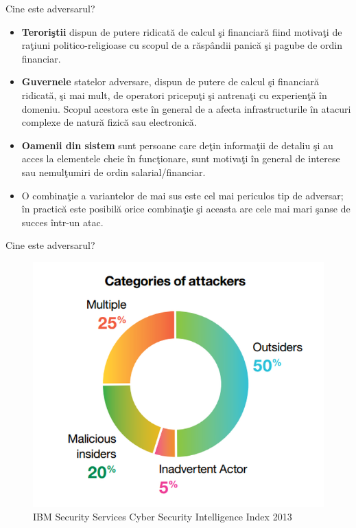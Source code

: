 \documentclass[pdf]{beamer}
\begin{document}
\begin{frame}{Cine este adversarul?}
\begin{itemize}
\item
\textbf{Teroriştii} dispun de putere ridicată de calcul şi financiară fiind motivaţi de raţiuni politico-religioase cu scopul de a răspândii panică şi pagube de ordin financiar.

\item
\textbf{Guvernele} statelor adversare, dispun de putere de calcul şi financiară ridicată, şi mai mult, de operatori pricepuţi şi antrenaţi cu experienţă în domeniu. Scopul acestora este în general de a afecta infrastructurile în atacuri complexe de natură fizică sau electronică.

\item
\textbf{Oamenii din sistem} sunt persoane care deţin informaţii de detaliu şi au acces la elementele cheie în funcţionare, sunt motivaţi în general de interese sau nemulţumiri de ordin salarial/financiar.

\item
O combinaţie a variantelor de mai sus este cel mai periculos tip de adversar; în practică este posibilă orice combinaţie şi aceasta are cele mai mari şanse de succes într-un atac.

\end{itemize}
\end{frame}



\begin{frame}{Cine este adversarul?}
\begin{figure}[t]
\centering
\includegraphics[scale=0.5]{Images/categories-of-attackers}
\caption{IBM Security Services Cyber Security Intelligence Index 2013}
\end{figure}
\end{frame}
\end{document}
